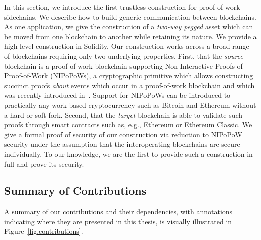 
\ifdraft
{}
In this section, we introduce the first
trustless construction for proof-of-work sidechains. We describe how to build
generic communication between blockchains. As one application, we give the
construction of a \emph{two-way pegged} asset which can be moved from one
blockchain to another while retaining its nature. We provide a high-level
construction in Solidity. Our construction works across a broad range of
blockchains requiring only two underlying properties. First, that the
\emph{source} blockchain is a proof-of-work blockchain supporting
Non-Interactive Proofs of Proof-of-Work (NIPoPoWs), a cryptographic primitive
which allows constructing succinct proofs \emph{about} events which occur in a
proof-of-work blockchain and which was recently introduced in~\cite{nipopows}.
Support for NIPoPoWs can be introduced to practically any
work-based cryptocurrency such as Bitcoin and Ethereum without a hard or soft
fork. Second, that the \emph{target} blockchain is able to validate such proofs
through smart contracts such as, e.g., Ethereum or Ethereum
Classic.
We give a formal proof of security of our construction via
reduction to NIPoPoW security under the assumption that the interoperating
blockchains are secure individually.
To our knowledge, we are the first to
provide such a construction in
full and prove its security.
\fi

\subsection{Summary of Contributions}
A summary of our contributions and their dependencies, with annotations
indicating where they are presented in this thesis, is visually illustrated in
Figure~\ref{fig.contributions}.

